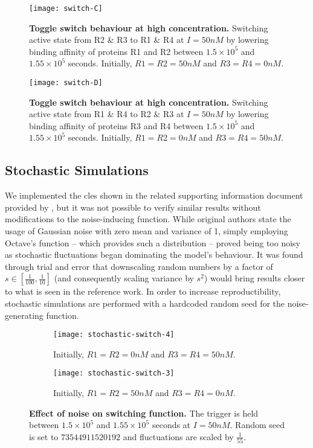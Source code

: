     \begin{figure}[!htb]
      \centering
      \texttt{[image: switch-C]}
      \caption{\textbf{Toggle switch behaviour at high concentration.} Switching active state from R2 \& R3 to R1 \& R4 at $I = 50 nM$ by lowering binding affinity of proteins R1 and R2 between $1.5 \times 10^5$ and $1.55 \times 10^5$ seconds. Initially, $R1 = R2 = 50nM$ and $R3 = R4 = 0nM$.}
      \label{fig:switch-C}
    \end{figure}
    \begin{figure}[!htb]
      \centering
      \texttt{[image: switch-D]}
      \caption{\textbf{Toggle switch behaviour at high concentration.} Switching active state from R1 \& R4 to R2 \& R3 at $I = 50 nM$ by lowering binding affinity of proteins R3 and R4 between $1.5 \times 10^5$ and $1.55 \times 10^5$ seconds. Initially, $R1 = R2 = 0nM$ and $R3 = R4 = 50nM$.}
      \label{fig:switch-D}
    \end{figure}


  \subsection{Stochastic Simulations}

    We implemented the \ac{cles} shown in the related supporting information document provided by \citet{multif}, but it was not possible to verify similar results without modifications to the noise-inducing function.
    While original authors state the usage of Gaussian noise with zero mean and variance of 1, simply employing Octave's  function -- which provides such a distribution \cite{randn} -- proved being too noisy as stochastic fluctuations began dominating the model's behaviour.
    It was found through trial and error that downscaling random numbers by a factor of $s \in [\frac{1}{100}, \frac{1}{10}]$ (and consequently scaling variance by $s^2$) would bring results closer to what is seen in the reference work.
    In order to increase reproductibility, stochastic simulations are performed with a hardcoded random seed for the noise-generating function.

    \begin{figure}[!htb]
      \centering
      \begin{subfigure}[t]{0.8\textwidth}
        \centering
        \texttt{[image: stochastic-switch-4]}
        \caption{Initially, $R1 = R2 = 0nM$ and $R3 = R4 = 50nM$.}
        \label{fig:stochastic-switch-4}
      \end{subfigure}
      \begin{subfigure}[t]{0.8\textwidth}
        \centering
        \texttt{[image: stochastic-switch-3]}
        \caption{Initially, $R1 = R2 = 50nM$ and $R3 = R4 = 0nM$.}
        \label{fig:stochastic-switch-3}
      \end{subfigure}
      \caption{\textbf{Effect of noise on switching function.} The trigger is held between $1.5 \times 10^5$ and $1.55 \times 10^5$ seconds at $I = 50 nM$. Random seed is set to $73544911520192$ and fluctuations are scaled by $\frac{1}{55}$.}
      \label{fig:stochastic-switch}
    \end{figure}

